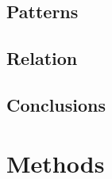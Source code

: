 \documentclass[a4,12pt]{article}
\begin{document}
\subsection{Patterns}
\subsection{Relation}
\subsection{Conclusions}
%
\section{Methods}
\end{document}
